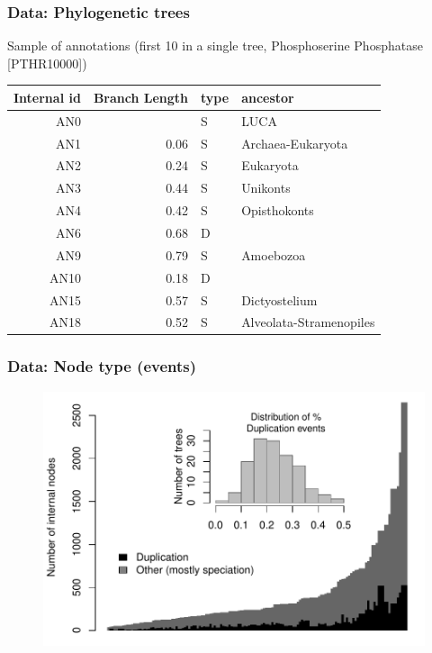 \documentclass[aspectratio=169, 9pt]{beamer}
\begin{document}
\begin{frame}
	\frametitle{Data: Phylogenetic trees}
	
	
	
	Sample of annotations (first 10 in a single tree, Phosphoserine Phosphatase [PTHR10000])
	
	\small
	
	\begin{table}[ht]
		\centering
		\begin{tabular}{rrll}
			\toprule
			Internal id & Branch Length & type & ancestor \\ 
			\midrule
			AN0 &  & S & LUCA \\ 
			AN1 & 0.06 & S & Archaea-Eukaryota \\ 
			AN2 & 0.24 & S & Eukaryota \\ 
			AN3 & 0.44 & S & Unikonts \\ 
			AN4 & 0.42 & S & Opisthokonts \\ 
			AN6 & 0.68 & D &  \\ 
			AN9 & 0.79 & S & Amoebozoa \\ 
			AN10 & 0.18 & D &  \\ 
			AN15 & 0.57 & S & Dictyostelium \\ 
			AN18 & 0.52 & S & Alveolata-Stramenopiles \\ 
			\bottomrule
		\end{tabular}
	\end{table}
	
\end{frame}

\begin{frame}
	\frametitle{Data: Node type (events)}
	\begin{figure}
		\centering
		\includegraphics[width=.7\linewidth]{distribution-event-type.pdf}
	\end{figure}
\end{frame}
\end{document}
